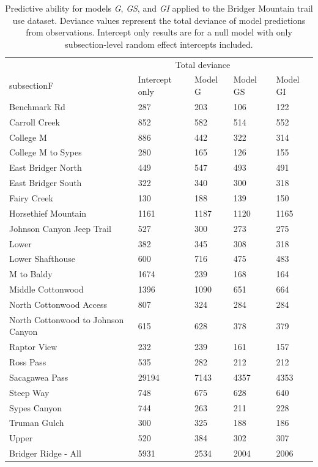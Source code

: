 \documentclass[
]{book}
\begin{document}
\begin{table}
\caption{\label{tab:deviance-kable}Predictive ability for models \emph{G}, \emph{GS}, and \emph{GI} applied to the Bridger Mountain trail use dataset. Deviance values represent the total deviance of model predictions from observations. Intercept only results are for a null model with only subsection-level random effect intercepts included.}
\centering
\begin{tabular}[t]{lllll}
\toprule
\multicolumn{1}{c}{ } & \multicolumn{3}{c}{Total deviance} \\
\cmidrule(l{3pt}r{3pt}){2-4}
subsectionF & Intercept only & Model G & Model GS & Model GI\\
\midrule
Benchmark Rd & 287 & 203 & 106 & 122\\
Carroll Creek & 852 & 582 & 514 & 552\\
College M & 886 & 442 & 322 & 314\\
College M to Sypes & 280 & 165 & 126 & 155\\
East Bridger North & 449 & 547 & 493 & 491\\
\addlinespace
East Bridger South & 322 & 340 & 300 & 318\\
Fairy Creek & 130 & 188 & 139 & 150\\
Horsethief Mountain & 1161 & 1187 & 1120 & 1165\\
Johnson Canyon Jeep Trail & 527 & 300 & 273 & 275\\
Lower & 382 & 345 & 308 & 318\\
\addlinespace
Lower Shafthouse & 600 & 716 & 475 & 483\\
M to Baldy & 1674 & 239 & 168 & 164\\
Middle Cottonwood & 1396 & 1090 & 651 & 664\\
North Cottonwood Access & 807 & 324 & 284 & 284\\
North Cottonwood to Johnson Canyon & 615 & 628 & 378 & 379\\
\addlinespace
Raptor View & 232 & 239 & 161 & 157\\
Ross Pass & 535 & 282 & 212 & 212\\
Sacagawea Pass & 29194 & 7143 & 4357 & 4353\\
Steep Way & 748 & 675 & 628 & 640\\
Sypes Canyon & 744 & 263 & 211 & 228\\
\addlinespace
Truman Gulch & 300 & 325 & 188 & 186\\
Upper & 520 & 384 & 302 & 307\\
Bridger Ridge - All & 5931 & 2534 & 2004 & 2006\\
\bottomrule
\end{tabular}
\end{table}
\end{document}
